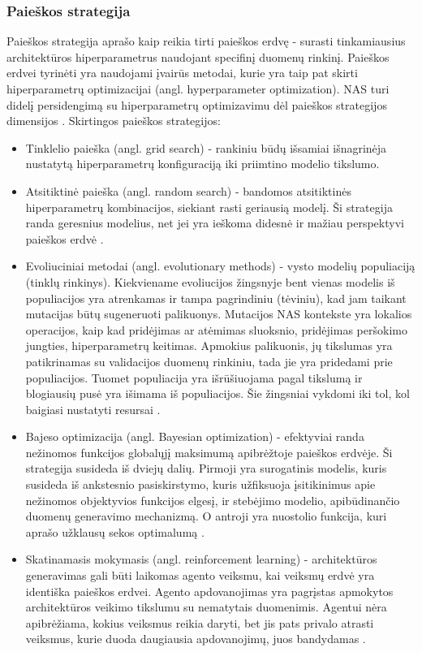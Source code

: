 \documentclass{VUMIFPSbakalaurinis}
\begin{document}
\subsubsection{Paieškos strategija}

Paieškos strategija aprašo kaip reikia tirti paieškos erdvę - surasti tinkamiausius architektūros hiperparametrus naudojant specifinį duomenų rinkinį. Paieškos erdvei tyrinėti yra naudojami įvairūs metodai, kurie yra taip pat skirti hiperparametrų optimizacijai (angl. hyperparameter optimization). NAS turi didelį persidengimą su hiperparametrų optimizavimu dėl paieškos strategijos dimensijos \cite{feurer-automlbook18a}.
Skirtingos paieškos strategijos:
\begin{itemize}
    \item Tinklelio paieška (angl. grid search) - rankiniu būdų išsamiai išnagrinėja nustatytą hiperparametrų konfiguraciją iki priimtino modelio tikslumo. 
    \item Atsitiktinė paieška (angl. random search) - bandomos atsitiktinės hiperparametrų kombinacijos, siekiant rasti geriausią modelį. Ši strategija randa geresnius modelius, net jei yra ieškoma didesnė ir mažiau perspektyvi paieškos erdvė \cite{Bergstra:2012:RSH:2503308.2188395}. 
    \item Evoliuciniai metodai (angl. evolutionary methods) - vysto modelių populiaciją (tinklų rinkinys). Kiekviename evoliucijos žingsnyje bent vienas modelis iš populiacijos yra atrenkamas ir tampa pagrindiniu (tėviniu), kad jam taikant mutacijas būtų sugeneruoti palikuonys. Mutacijos NAS kontekste yra lokalios operacijos, kaip kad pridėjimas ar atėmimas sluoksnio, pridėjimas peršokimo jungties, hiperparametrų keitimas. Apmokius palikuonis, jų tikslumas yra patikrinamas su validacijos duomenų rinkiniu, tada jie yra pridedami prie populiacijos. Tuomet populiacija yra išrūšiuojama pagal tikslumą ir blogiausių pusė yra išimama iš populiacijos. Šie žingsniai vykdomi iki tol, kol baigiasi nustatyti resursai \cite{DBLP:journals/corr/abs-1812-05866}.
    \item Bajeso optimizacija (angl. Bayesian optimization) - efektyviai randa nežinomos funkcijos globalųjį maksimumą apibrėžtoje paieškos erdvėje. Ši strategija susideda iš dviejų dalių. Pirmoji yra surogatinis modelis, kuris susideda iš ankstesnio pasiskirstymo, kuris užfiksuoja įsitikinimus apie nežinomos objektyvios funkcijos elgesį, ir stebėjimo modelio, apibūdinančio duomenų generavimo mechanizmą. O antroji yra nuostolio funkcija, kuri aprašo užklausų sekos optimalumą \cite{7352306}. 
    \item Skatinamasis mokymasis (angl. reinforcement learning) - architektūros generavimas gali būti laikomas agento veiksmu, kai veiksmų erdvė yra identiška paieškos erdvei. Agento apdovanojimas yra pagrįstas apmokytos architektūros veikimo tikslumu su nematytais duomenimis. Agentui nėra apibrėžiama, kokius veiksmus reikia daryti, bet jis pats privalo atrasti veiksmus, kurie duoda daugiausia apdovanojimų, juos bandydamas \cite{Sutton:1998:IRL:551283}.
\end{itemize}
\end{document}

